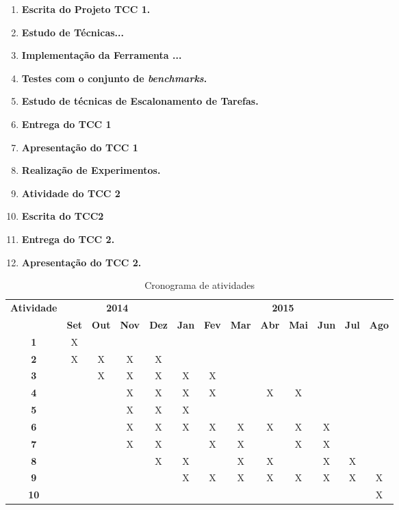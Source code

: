\begin{enumerate}
\item \textbf{Escrita do Projeto TCC 1.}
\item \textbf{Estudo de Técnicas...}
\item \textbf{Implementação da Ferramenta ...}
\item \textbf{Testes com o conjunto de \textit{benchmarks}.}
\item \textbf{Estudo de técnicas de Escalonamento de Tarefas.}
\item \textbf{Entrega do TCC 1}
\item \textbf{Apresentação do TCC 1}
\item \textbf{Realização de Experimentos.}
\item \textbf{Atividade do TCC 2}
\item \textbf{Escrita do TCC2}
\item \textbf{Entrega do TCC 2.}
\item \textbf{Apresentação do TCC 2.}
\end{enumerate}

\begin{table}[h!]
\renewcommand{\arraystretch}{1.3}
\caption{Cronograma de atividades}
\label{tab:cronograma}
\begin{tabular}{|c|c|c|c|c|c|c|c|c|c|c|c|c|}
\hline
\multirow{2}{*}{\textbf{\textbf{Atividade}}} & \multicolumn{4}{c|}{\textbf{2014}}& \multicolumn{8}{c|}{\textbf{2015}} \\ \cline{2-13} 
& \multicolumn{1}{l|}{\textbf{Set}} & \multicolumn{1}{l|}{\textbf{Out}} & \multicolumn{1}{l|}{\textbf{Nov}} & \multicolumn{1}{l|}{\textbf{Dez}} & \multicolumn{1}{l|}{\textbf{Jan}} & \multicolumn{1}{l|}{\textbf{Fev}} & \multicolumn{1}{l|}{\textbf{Mar}} & \multicolumn{1}{l|}{\textbf{Abr}} & \multicolumn{1}{l|}{\textbf{Mai}} & \multicolumn{1}{l|}{\textbf{Jun}} & \multicolumn{1}{l|}{\textbf{Jul}} & \multicolumn{1}{l|}{\textbf{Ago}} \\ \hline
\textbf{1}  & X &   &   &   &   &   &   &   &   &   &   &  \\ \hline
\textbf{2}  & X & X & X & X &   &   &   &   &   &   &   &  \\ \hline
\textbf{3}  &   & X & X & X & X & X &   &   &   &   &   &  \\ \hline
\textbf{4}  &   &   & X & X & X & X &   & X & X &   &   &  \\ \hline
\textbf{5}  &   &   & X & X & X &   &   &   &   &   &   &  \\ \hline
\textbf{6}  &   &   & X & X & X & X & X & X & X & X &   &  \\ \hline
\textbf{7}  &   &   & X & X &   & X & X &   & X & X &   &  \\ \hline
\textbf{8}  &   &   &   & X & X &   & X & X &   & X & X &  \\ \hline
\textbf{9}  &   &   &   &   & X & X & X & X & X & X & X & X \\ \hline
\textbf{10} &   &   &   &   &   &   &   &   &   &   &   & X \\ \hline
\end{tabular}
\end{table}


